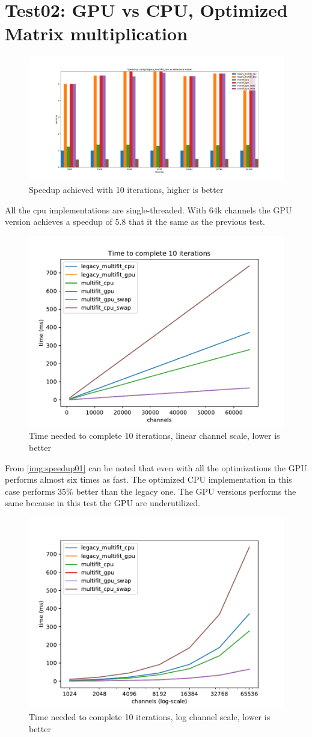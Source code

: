 \section{Test02: GPU vs CPU, Optimized Matrix multiplication}

\begin{figure}[h]
  \includegraphics[width=\textwidth]{img/speedup02}
  \caption{Speedup achieved with 10 iterations, higher is better}
  \label{img:speedup02}
\end{figure}
All the cpu implementations are single-threaded. With 64k channels the GPU version achieves a speedup of 5.8 that it the same as the previous test.
\begin{figure}[H]
  \includegraphics[width=.75\textwidth]{img/linscale02}
  \caption{Time needed to complete 10 iterations, linear channel scale, lower is better}
  \label{img:linscale02}
\end{figure}
From \ref{img:speedup01} can be noted that even with all the optimizations the GPU performs almost six times as fast.  The optimized CPU implementation in this case performs $35\%$ better than the legacy one. The GPU versions performs the same because in this test the GPU are underutilized.
\begin{figure}[H]
  \includegraphics[width=.75\textwidth]{img/logscale02}
  \caption{Time needed to complete 10 iterations, log channel scale, lower is better}
  \label{img:logscale02}
\end{figure}